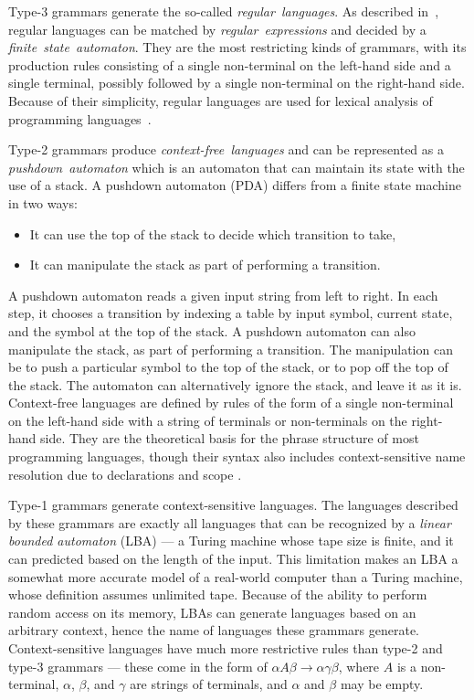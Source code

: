 \documentclass[english,engineering]{wizthesis}
\newcommand{\paraphrase}[1]{#1}
\begin{document}
Type-3 grammars generate the so-called \emph{regular~languages}. As described
in~\cite{aho-1990}, regular languages can be matched by
\emph{regular~expressions} and decided by a \emph{finite~state~automaton}.
They are the most restricting kinds of grammars, with its production rules
consisting of a single non-terminal on the left-hand side and a single terminal,
possibly followed by a single non-terminal on the right-hand side. Because of
their simplicity, regular languages are used for lexical analysis of programming
languages~\cite{johnson-1968}.

Type-2 grammars produce \emph{context-free~languages} and can be represented as
a \emph{pushdown~automaton} which is an automaton that can maintain its state
with the use of a stack. A pushdown automaton (PDA) differs from a finite state
machine in two ways:
\paraphrase{\begin{itemize}[noitemsep]
  \item It can use the top of the stack to decide which transition to take,
  \item It can manipulate the stack as part of performing a transition.
\end{itemize}
A pushdown automaton reads a given input string from left to right. In each
step, it chooses a transition by indexing a table by input symbol, current
state, and the symbol at the top of the stack. A pushdown automaton can also
manipulate the stack, as part of performing a transition. The manipulation can
be to push a particular symbol to the top of the stack, or to pop off the top of
the stack. The automaton can alternatively ignore the stack, and leave it as it
is.} Context-free languages are defined by rules of the form of a single
non-terminal on the left-hand side with a string of terminals or non-terminals
on the right-hand side. They are the theoretical basis for the phrase structure
of most programming languages, though their syntax also includes
context-sensitive name resolution due to declarations and scope
\cite{hopcroft-2005}.

Type-1 grammars generate context-sensitive languages. The languages described by
these grammars are exactly all languages that can be recognized by a
\emph{linear bounded automaton} (LBA) --- a Turing machine whose tape size is
finite, and it can predicted based on the length of the input. This limitation
makes an LBA a somewhat more accurate model of a real-world computer than a
Turing machine, whose definition assumes unlimited tape. Because of the ability
to perform random access on its memory, LBAs can generate languages based on an
arbitrary context, hence the name of languages these grammars generate.
Context-sensitive languages have much more restrictive rules than type-2 and
type-3 grammars --- these come in the form of $\alpha A \beta \rightarrow \alpha
\gamma \beta$, where $A$ is a non-terminal, $\alpha$, $\beta$, and $\gamma$ are
strings of terminals, and $\alpha$ and $\beta$ may be empty.
\end{document}
